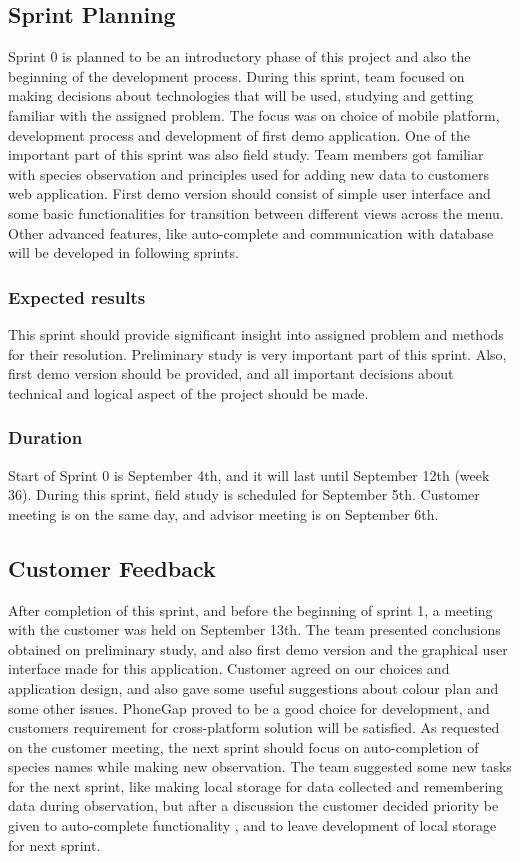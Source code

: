 \subsection{Sprint Planning}
	Sprint 0 is planned to be an introductory phase of this project and also the beginning of the development process. During this sprint, team focused on making decisions about technologies that will be used, studying and getting familiar with the assigned problem. The focus was on choice of mobile platform, development process and development of first demo application. One of the important part of this sprint was also field study. Team members got familiar with species observation and principles used for adding new data to customers web application.\newline
	First demo version should consist of simple user interface and some basic functionalities for transition between different views across the menu. Other advanced features, like auto-complete and communication with database will be developed in following sprints.
	
	\subsubsection{Expected results}
	This sprint should provide significant insight into assigned problem and methods for their resolution. Preliminary study is very important part of this sprint. Also, first demo version should be provided, and all important decisions about technical and logical aspect of the project should be made.
	
	\subsubsection{Duration}
	Start of Sprint 0 is September 4th, and it will last until September 12th (week 36). During this sprint, field study is scheduled for September 5th. Customer meeting is on the same day, and advisor meeting is on September 6th.
	
	
	
\subsection{Customer Feedback}
	After completion of this sprint, and before the beginning of sprint 1, a meeting with the customer was held on September 13th. The team presented conclusions obtained on preliminary study, and also first demo version and the graphical user interface made for this application. Customer agreed on our choices and application design, and also gave some useful suggestions about colour plan and some other issues. PhoneGap proved to be a good choice for development, and customers requirement for cross-platform solution will be satisfied.\newline
	As requested on the customer meeting, the next sprint should focus on auto-completion of species names while making new observation. The team suggested some new tasks for the next sprint, like making local storage for data collected and remembering data during observation, but after a discussion the customer decided priority be given to auto-complete functionality , and to leave development of local storage for next sprint.
	

